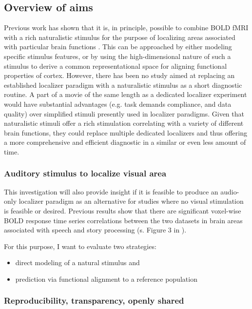 \subsection{Overview of aims}
%
Previous work has shown that it is, in principle, possible to combine BOLD fMRI
with a rich naturalistic stimulus for the purpose of localizing areas associated
with particular brain functions \citep{bartels2004mapping}.
%
This can be approached by either modeling specific stimulus features, or by
using the high-dimensional nature of such a stimulus to derive a common
representational space for aligning functional properties of cortex.
%
However, there has been no study aimed at replacing an established localizer
paradigm with a naturalistic stimulus as a short diagnostic routine.
%
A part of a movie of the same length as a dedicated localizer experiment would
have substantial advantages (e.g. task demands compliance, and data quality)
over simplified stimuli presently used in localizer paradigms.
%
Given that naturalistic stimuli offer a rich stimulation correlating with a
variety of different brain functions, they could replace multiple dedicated
localizers and thus offering a more comprehensive and efficient diagnostic in a
similar or even less amount of time.



\subsubsection{Auditory stimulus to localize visual area}
%
This investigation will also provide insight if it is feasible to produce an
audio-only localizer paradigm as an alternative for studies where no visual
stimulation is feasible or desired.
%
Previous results show that there are significant voxel-wise BOLD response time
series correlations between the two datasets in brain areas associated with
speech and story processing (s. Figure 3 in \citep{hanke2016simultaneous}).

%

For this purpose, I want to evaluate two strategies:

\begin{itemize}
    \item direct modeling of a natural stimulus and
    \item prediction via functional alignment to a reference population
\end{itemize}


\subsubsection{Reproducibility, transparency, openly shared}

